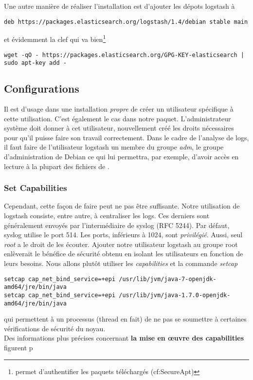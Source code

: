 Une autre manière de réaliser l'installation est d'ajouter les dépots logstash à 

\begin{lstlisting}[style=code,label={lst:ajoutdepotlogstash}]
deb https://packages.elasticsearch.org/logstash/1.4/debian stable main
\end{lstlisting}

et évidemment la clef qui va bien\footnote{permet d'authentifier les paquets téléchargés
(cf:SecureApt)}

\begin{lstlisting}[style=code,label={lst:ajoutclefdepotlogstash}]
wget -qO - https://packages.elasticsearch.org/GPG-KEY-elasticsearch | sudo apt-key add -
\end{lstlisting}

\subsection{Configurations}
Il est d'usage dans une installation \textit{propre} de créer un utilisateur spécifique
à cette utilisation. C'est également le cas dans notre paquet. L'administrateur 
système doit donner à cet utilisateur, nouvellement créé les droits nécessaires 
pour qu'il puisse faire son travail correctement. Dans le cadre de l'analyse de logs, 
il faut faire de l'utilisateur logstash un membre du groupe \emph{adm}, le groupe 
d'administration de Debian ce qui lui permettra, par exemple, d'avoir accès en 
lecture à la plupart des fichiers de .

\subsubsection{Set Capabilities}
Cependant, cette façon de faire peut ne pas être suffisante.
Notre utilisation de logstash consiste, entre autre, à centraliser les \gls{logs}. 
Ces derniers sont généralement envoyés par l'intermédiaire de syslog (RFC 5244).
Par défaut, syslog utilise le port 514. Les ports, inférieurs à 1024, sont \textit{privilégié}.
Aussi, seul \emph{root} a le droit de les écouter. Ajouter notre utilisateur 
logstash au groupe root enlèverait le bénéfice de sécurité obtenu en isolant les 
utilisateurs en fonction de leurs besoins. Nous allons plutôt utiliser les 
\emph{capabilities} 
et la commande \emph{setcap}
\begin{lstlisting}[style=code,label={lst:setcapabilities}]
setcap cap_net_bind_service=+epi /usr/lib/jvm/java-7-openjdk-amd64/jre/bin/java
setcap cap_net_bind_service=+epi /usr/lib/jvm/java-1.7.0-openjdk-amd64/jre/bin/java
\end{lstlisting}
qui permettent à un processus (thread en fait) de ne pas se soumettre à certaines 
vérifications de sécurité du noyau.\\[2mm]
Des informations plus précises concernant \textbf{la mise en œuvre des capabilities} 
figurent p\pageref{subsec:logstashcapabilities}

